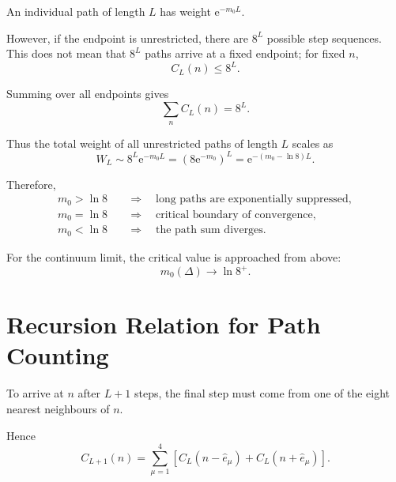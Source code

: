 \documentclass[11pt,a4paper,oneside]{article}
\newcommand{\ee}{\mathrm{e}}
\begin{document}
	An individual path of length $L$ has weight $\ee^{-m_0L}$.
	
	However, if the endpoint is unrestricted, there are $8^L$ possible step
	sequences. This does not mean that $8^L$ paths arrive at a fixed endpoint;
	for fixed $n$,
	\[
	C_L(n)\leq 8^L.
	\]
	
	Summing over all endpoints gives
	\begin{equation}
		\sum_n C_L(n)=8^L.
	\end{equation}
	
	Thus the total weight of all unrestricted paths of length $L$ scales as
	\begin{equation}
		W_L
		\sim
		8^L\ee^{-m_0L}
		=
		\left(8\ee^{-m_0}\right)^L
		=
		\ee^{-(m_0-\ln8)L}.
		\label{eq:entropy-energy}
	\end{equation}
	
	Therefore,
	\begin{align}
		m_0>\ln8
		&\quad\Longrightarrow\quad
		\text{long paths are exponentially suppressed},
		\\
		m_0=\ln8
		&\quad\Longrightarrow\quad
		\text{critical boundary of convergence},
		\\
		m_0<\ln8
		&\quad\Longrightarrow\quad
		\text{the path sum diverges}.
	\end{align}
	
	For the continuum limit, the critical value is approached from above:
	\begin{equation}
		m_0(\Delta)\to\ln8^+.
	\end{equation}
	
	
	\section{Recursion Relation for Path Counting}
	
	To arrive at $n$ after $L+1$ steps, the final step must come from one of the
	eight nearest neighbours of $n$.
	
	Hence
	\begin{equation}
		\boxed{
			C_{L+1}(n)
			=
			\sum_{\mu=1}^{4}
			\left[
			C_L(n-\hat e_\mu)
			+
			C_L(n+\hat e_\mu)
			\right].
		}
		\label{eq:recurrence}
	\end{equation}
	
	
\end{document}
